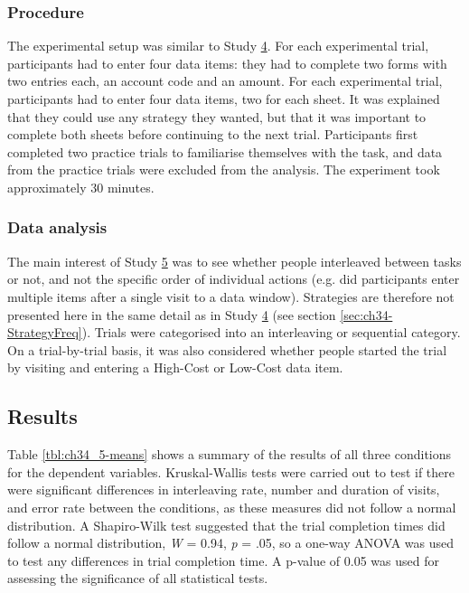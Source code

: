 
\subsubsection{Procedure}
The experimental setup was similar to Study \hyperref[st:Study4]{4}. For each experimental trial, participants had to enter four data items: they had to complete two forms with two entries each, an account code and an amount. For each experimental trial, participants had to enter four data items, two for each sheet. It was explained that they could use any strategy they wanted, but that it was important to complete both sheets before continuing to the next trial. Participants first completed two practice trials to familiarise themselves with the task, and data from the practice trials were excluded from the analysis. The experiment took approximately 30 minutes.

\subsubsection{Data analysis}
The main interest of Study \hyperref[st:Study5]{5} was to see whether people interleaved between tasks or not, and not the specific order of individual actions (e.g. did participants enter multiple items after a single visit to a data window). Strategies are therefore not presented here in the same detail as in Study \hyperref[st:Study4]{4} (see section \ref{sec:ch34-StrategyFreq}). Trials were categorised into an interleaving or sequential category. On a trial-by-trial basis, it was also considered whether people started the trial by visiting and entering a High-Cost or Low-Cost data item.

\subsection{Results}
Table \ref{tbl:ch34_5-means} shows a summary of the results of all three conditions for the dependent variables. Kruskal-Wallis tests were carried out to test if there were significant differences in interleaving rate, number and duration of visits, and error rate between the conditions, as these measures did not follow a normal distribution. 
A Shapiro-Wilk test suggested that the trial completion times did follow a normal distribution, \textit{W} = 0.94, \textit{p} = .05, so a one-way ANOVA was used to test any differences in trial completion time. A p-value of 0.05 was used for assessing the significance of all statistical tests. 

